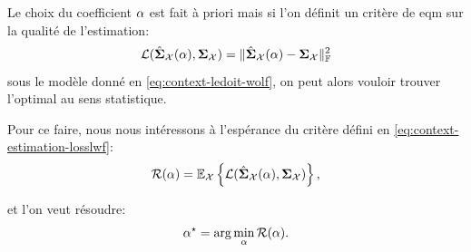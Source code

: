 Le choix du coefficient $\alpha$ est fait à priori mais si l'on définit un critère de eqm sur la qualité de l'estimation:
\begin{equation}
  \mathcal{L}(\hat{\boldsymbol{\Sigma}}_{\mathcal{X}}(\alpha), \boldsymbol{\Sigma}_{\mathcal{X}}) = \| \hat{\boldsymbol{\Sigma}}_{\mathcal{X}}(\alpha) - \boldsymbol{\Sigma}_{\mathcal{X}} \|_{\mathbb{F}}^2
  \label{eq:context-estimation-losslwf}
\end{equation}
sous le modèle donné en \cref{eq:context-ledoit-wolf}, on peut alors vouloir trouver l'optimal au sens statistique.

Pour ce faire, nous nous intéressons à l'espérance du critère défini en \cref{eq:context-estimation-losslwf}:
$$
  \mathcal{R}(\alpha) = \operatorname{\mathbb{E}}_{\mathcal{X}}\left\{\mathcal{L}(\hat{\boldsymbol{\Sigma}}_{\mathcal{X}}(\alpha), \boldsymbol{\Sigma}_{\mathcal{X}})\right\},
$$

et l'on veut résoudre:
\begin{equation}
  \alpha^\star = \arg\min_\alpha \mathcal{R}(\alpha).
\end{equation}


%
%
%
%
%



